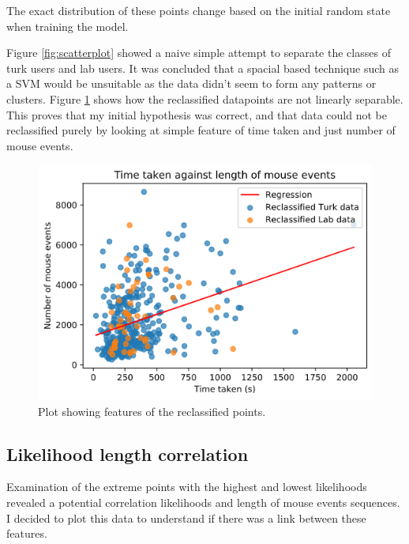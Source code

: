 \documentclass{article}
\begin{document}
The exact distribution of these points change based on the initial random state when training the model.

Figure \ref{fig:scatterplot} showed a naive simple attempt to separate the classes of turk users and lab users.
It was concluded that a spacial based technique such as a SVM would be unsuitable as the data didn't seem to form any patterns or clusters.
Figure \ref{fig:Reclassified-Scatterplot} shows how the reclassified datapoints are not linearly separable.
This proves that my initial hypothesis was correct, and that data could not be reclassified purely by looking at simple feature of time taken and just number of mouse events.

\begin{figure}[ht!]
    \centering
    \includegraphics[scale=0.5]{Images/TimeTaken-Mouse-Events-Reclassified.png}
    \caption{Plot showing features of the reclassified points. }
    \label{fig:Reclassified-Scatterplot}
\end{figure}

\subsection{Likelihood length correlation}

Examination of the extreme points with the highest and lowest likelihoods revealed a potential correlation likelihoods and length of mouse events sequences.
I decided to plot this data to understand if there was a link between these features.
\end{document}
